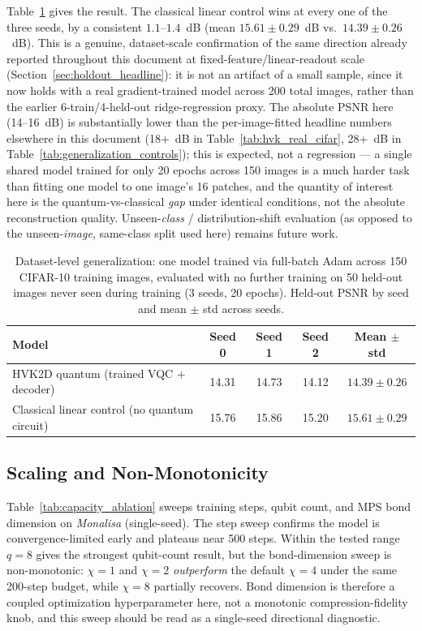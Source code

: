 \documentclass[11pt]{article}
\begin{document}
Table~\ref{tab:dataset_level_generalization} gives the result. The classical linear control wins at every one of the three seeds, by a consistent $1.1$--$1.4$~dB (mean $15.61\pm0.29$~dB vs.\ $14.39\pm0.26$~dB). This is a genuine, dataset-scale confirmation of the same direction already reported throughout this document at fixed-feature/linear-readout scale (Section~\ref{sec:holdout_headline}): it is not an artifact of a small sample, since it now holds with a real gradient-trained model across 200 total images, rather than the earlier 6-train/4-held-out ridge-regression proxy. The absolute PSNR here (14--16~dB) is substantially lower than the per-image-fitted headline numbers elsewhere in this document (18+~dB in Table~\ref{tab:hvk_real_cifar}, 28+~dB in Table~\ref{tab:generalization_controls}); this is expected, not a regression --- a single shared model trained for only 20 epochs across 150 images is a much harder task than fitting one model to one image's 16 patches, and the quantity of interest here is the quantum-vs-classical \emph{gap} under identical conditions, not the absolute reconstruction quality. Unseen-\emph{class} / distribution-shift evaluation (as opposed to the unseen-\emph{image}, same-class split used here) remains future work.

\begin{table}[H]
\centering
\caption{Dataset-level generalization: one model trained via full-batch Adam across 150 CIFAR-10 training images, evaluated with no further training on 50 held-out images never seen during training (3 seeds, 20 epochs). Held-out PSNR by seed and mean $\pm$ std across seeds.}
\label{tab:dataset_level_generalization}
\scriptsize
\begin{tabular}{lcccc}
\toprule
Model & Seed 0 & Seed 1 & Seed 2 & Mean $\pm$ std \\
\midrule
HVK2D quantum (trained VQC + decoder) & 14.31 & 14.73 & 14.12 & $14.39\pm0.26$ \\
Classical linear control (no quantum circuit) & 15.76 & 15.86 & 15.20 & $15.61\pm0.29$ \\
\bottomrule
\end{tabular}
\end{table}

\subsection{Scaling and Non-Monotonicity}
Table~\ref{tab:capacity_ablation} sweeps training steps, qubit count, and MPS bond dimension on \textit{Monalisa} (single-seed). The step sweep confirms the model is convergence-limited early and plateaus near 500 steps. Within the tested range $q=8$ gives the strongest qubit-count result, but the bond-dimension sweep is non-monotonic: $\chi=1$ and $\chi=2$ \emph{outperform} the default $\chi=4$ under the same 200-step budget, while $\chi=8$ partially recovers. Bond dimension is therefore a coupled optimization hyperparameter here, not a monotonic compression-fidelity knob, and this sweep should be read as a single-seed directional diagnostic.
\end{document}
